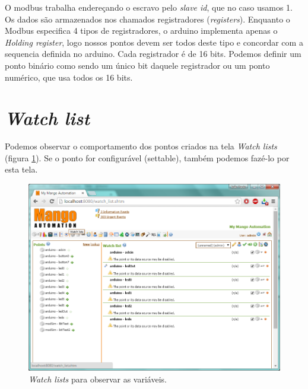 O modbus trabalha endereçando o escravo pelo \emph{slave id}, que no caso usamos 1. Os dados são armazenados nos chamados registradores (\emph{registers}). Enquanto o Modbus especifica 4 tipos de registradores, o arduino implementa apenas o \emph{Holding register}, logo nossos pontos devem ser todos deste tipo e concordar com a sequencia definida no arduino.
Cada registrador é de 16 bits. Podemos definir um ponto binário como sendo um único bit daquele registrador ou um ponto numérico, que usa todos os 16 bits.

\section{\emph{Watch list}}
Podemos observar o comportamento dos pontos criados na tela \emph{Watch lists} (figura \ref{fig:mango_watch}). Se o ponto for configurável (settable), também podemos fazé-lo por esta tela.

\begin{figure}[hbt]
	\begin{center}
		\includegraphics[width=\textwidth]{figuras/mango_watch}
	\end{center}
	\caption{\emph{Watch lists} para observar as variáveis.}
	\label{fig:mango_watch}
\end{figure}

